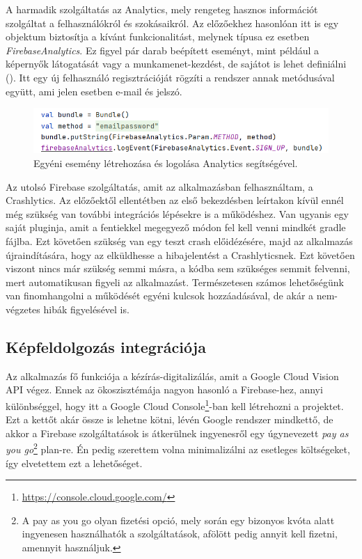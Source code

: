 A harmadik szolgáltatás az Analytics, mely rengeteg hasznos információt szolgáltat a felhasználókról és szokásaikról. Az előzőekhez hasonlóan itt is egy objektum biztosítja a kívánt funkcionalitást, melynek típusa ez esetben \emph{FirebaseAnalytics}. Ez figyel pár darab beépített eseményt, mint például a képernyők látogatását vagy a munkamenet-kezdést, de sajátot is lehet definiálni (). Itt egy új felhasználó regisztrációját rögzíti a rendszer annak metódusával együtt, ami jelen esetben e-mail és jelszó.

\begin{figure}[!ht]
	\centering
	\includegraphics[width=120mm, keepaspectratio]{figures/analytics_custom.png}
	\caption{Egyéni esemény létrehozása és logolása Analytics segítségével.}
	\label{fig:Analytics}
\end{figure}

Az utolsó Firebase szolgáltatás, amit az alkalmazásban felhasználtam, a Crashlytics. Az előzőektől ellentétben az első bekezdésben leírtakon kívül ennél még szükség van további integrációs lépésekre is a működéshez. Van ugyanis egy saját pluginja, amit a fentiekkel megegyező módon fel kell venni mindkét gradle fájlba. Ezt követően szükség van egy teszt crash előidézésére, majd az alkalmazás újraindítására, hogy az elküldhesse a hibajelentést a Crashlyticsnek. Ezt követően viszont nincs már szükség semmi másra, a kódba sem szükséges semmit felvenni, mert automatikusan figyeli az alkalmazást. Természetesen számos lehetőségünk van finomhangolni a működését egyéni kulcsok hozzáadásával, de akár a nem-végzetes hibák figyelésével is.

\subsection{Képfeldolgozás integrációja}
Az alkalmazás fő funkciója a kézírás-digitalizálás, amit a Google Cloud Vision API végez. Ennek az ökoszisztémája nagyon hasonló a Firebase-hez, annyi különbséggel, hogy itt a Google Cloud Console\footnote{\url{https://console.cloud.google.com/}}-ban kell létrehozni a projektet. Ezt a kettőt akár össze is lehetne kötni, lévén Google rendszer mindkettő, de akkor a Firebase szolgáltatások is átkerülnek ingyenesről egy úgynevezett \emph{pay as you go}\footnote{A pay as you go olyan fizetési opció, mely során egy bizonyos kvóta alatt ingyenesen használhatók a szolgáltatások, afölött pedig annyit kell fizetni, amennyit használjuk.} plan-re. Én pedig szerettem volna minimalizálni az esetleges költségeket, így elvetettem ezt a lehetőséget.
	

